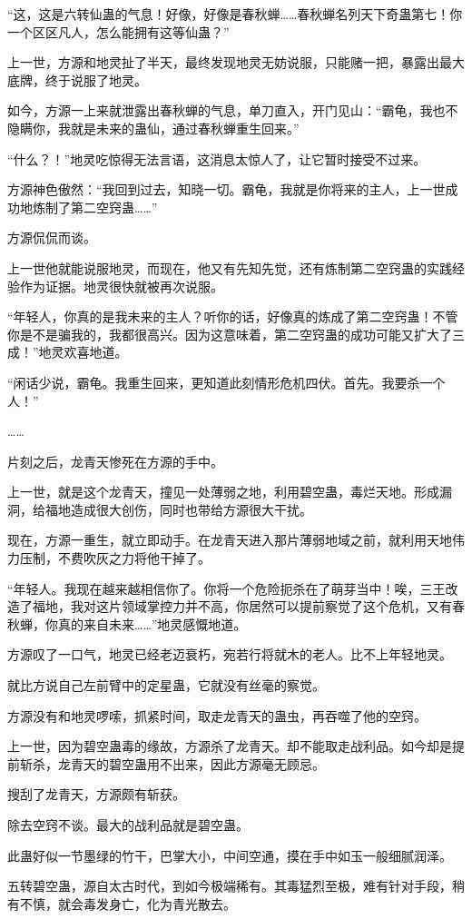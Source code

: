 \begin{this_body}
“这，这是六转仙蛊的气息！好像，好像是春秋蝉……春秋蝉名列天下奇蛊第七！你一个区区凡人，怎么能拥有这等仙蛊？”

上一世，方源和地灵扯了半天，最终发现地灵无妨说服，只能赌一把，暴露出最大底牌，终于说服了地灵。

如今，方源一上来就泄露出春秋蝉的气息，单刀直入，开门见山：“霸龟，我也不隐瞒你，我就是未来的蛊仙，通过春秋蝉重生回来。”

“什么？！”地灵吃惊得无法言语，这消息太惊人了，让它暂时接受不过来。

方源神色傲然：“我回到过去，知晓一切。霸龟，我就是你将来的主人，上一世成功地炼制了第二空窍蛊……”

方源侃侃而谈。

上一世他就能说服地灵，而现在，他又有先知先觉，还有炼制第二空窍蛊的实践经验作为证据。地灵很快就被再次说服。

“年轻人，你真的是我未来的主人？听你的话，好像真的炼成了第二空窍蛊！不管你是不是骗我的，我都很高兴。因为这意味着，第二空窍蛊的成功可能又扩大了三成！”地灵欢喜地道。

“闲话少说，霸龟。我重生回来，更知道此刻情形危机四伏。首先。我要杀一个人！”

……

片刻之后，龙青天惨死在方源的手中。

上一世，就是这个龙青天，撞见一处薄弱之地，利用碧空蛊，毒烂天地。形成漏洞，给福地造成很大创伤，同时也带给方源很大干扰。

现在，方源一重生，就立即动手。在龙青天进入那片薄弱地域之前，就利用天地伟力压制，不费吹灰之力将他干掉了。

“年轻人。我现在越来越相信你了。你将一个危险扼杀在了萌芽当中！唉，三王改造了福地，我对这片领域掌控力并不高，你居然可以提前察觉了这个危机，又有春秋蝉，你真的来自未来……”地灵感慨地道。

方源叹了一口气，地灵已经老迈衰朽，宛若行将就木的老人。比不上年轻地灵。

就比方说自己左前臂中的定星蛊，它就没有丝毫的察觉。

方源没有和地灵啰嗦，抓紧时间，取走龙青天的蛊虫，再吞噬了他的空窍。

上一世，因为碧空蛊毒的缘故，方源杀了龙青天。却不能取走战利品。如今却是提前斩杀，龙青天的碧空蛊用不出来，因此方源毫无顾忌。

搜刮了龙青天，方源颇有斩获。

除去空窍不谈。最大的战利品就是碧空蛊。

此蛊好似一节墨绿的竹干，巴掌大小，中间空通，摸在手中如玉一般细腻润泽。

五转碧空蛊，源自太古时代，到如今极端稀有。其毒猛烈至极，难有针对手段，稍有不慎，就会毒发身亡，化为青光散去。


\end{this_body}

